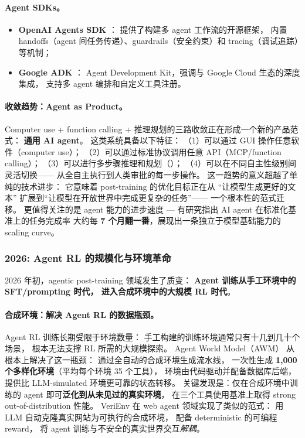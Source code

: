 \paragraph{Agent SDKs。}
\begin{itemize}[leftmargin=2em]
  \item \textbf{OpenAI Agents SDK} \cite{openai2025agentssdk}：
    提供了构建多 agent 工作流的开源框架，
    内置 handoffs（agent 间任务传递）、guardrails（安全约束）和 tracing（调试追踪）等机制；
  \item \textbf{Google ADK} \cite{google2025adk}：
    Agent Development Kit，强调与 Google Cloud 生态的深度集成，
    支持多 agent 编排和自定义工具注册。
\end{itemize}

\paragraph{收敛趋势：Agent as Product。}
Computer use + function calling + 推理规划的三路收敛正在形成一个新的产品范式：
\textbf{通用 AI agent}。
这类系统具备以下特征：
（1）可以通过 GUI 操作任意软件（computer use）；
（2）可以通过标准协议调用任意 API（MCP/function calling）；
（3）可以进行多步骤推理和规划（）；
（4）可以在不同自主性级别间灵活切换——
从全自主执行到人类审批的每一步操作。
这一趋势的意义超越了单纯的技术进步：
它意味着 post-training 的优化目标正在从
``让模型生成更好的文本''
扩展到``让模型在开放世界中完成更复杂的任务''——
一个根本性的范式迁移。
更值得关注的是 agent 能力的进步速度 ---
有研究指出 AI agent 在标准化基准上的任务完成率
大约每 \textbf{7 个月翻一番}，展现出一条独立于模型基础能力的 scaling curve。

\subsubsection{2026: Agent RL 的规模化与环境革命}
\label{sec:t6-2026}

2026 年初，agentic post-training 领域发生了质变：
\textbf{Agent 训练从手工环境中的 SFT/prompting 时代，
进入合成环境中的大规模 RL 时代}。

\paragraph{合成环境：解决 Agent RL 的数据瓶颈。}
Agent RL 训练长期受限于环境数量：
手工构建的训练环境通常只有十几到几十个场景，
根本无法支撑 RL 所需的大规模探索。
 Agent World Model（AWM）
从根本上解决了这一瓶颈：
通过全自动的合成环境生成流水线，
一次性生成 \textbf{1,000 个多样化环境}（平均每个环境 35 个工具），
环境由代码驱动并配备数据库后端，
提供比 LLM-simulated 环境更可靠的状态转移。
关键发现是：仅在合成环境中训练的 agent
即可\textbf{泛化到从未见过的真实环境}，
在三个工具使用基准上取得 strong out-of-distribution 性能。
VeriEnv \cite{chae2026verienv} 在 web agent 领域实现了类似的范式：
用 LLM 自动克隆真实网站为可执行的合成环境，
配备 deterministic 的可编程 reward，
将 agent 训练与不安全的真实世界交互\emph{解耦}。

